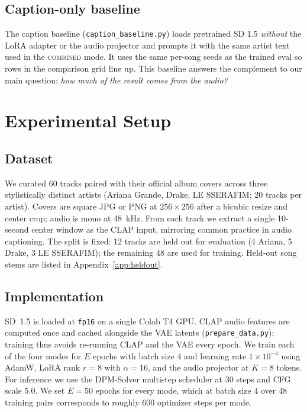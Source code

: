 \documentclass{article}
\begin{document}
\subsection{Caption-only baseline}
The caption baseline (\texttt{caption\_baseline.py}) loads pretrained SD
1.5 \emph{without} the LoRA adapter or the audio projector and prompts it
with the same artist text used in the \textsc{combined} mode. It uses the
same per-song seeds as the trained eval so rows in the comparison grid line
up. This baseline answers the complement to our main question: \emph{how
much of the result comes from the audio?}

\section{Experimental Setup}
\label{sec:setup}

\subsection{Dataset}
We curated 60 tracks paired with their official album covers across three
stylistically distinct artists (Ariana Grande, Drake, LE SSERAFIM; 20 tracks
per artist). Covers are square JPG or PNG at $256\times256$ after a
bicubic resize and center crop; audio is mono at 48~kHz. From each track we
extract a single 10-second center window as the CLAP input, mirroring
common practice in audio captioning. The split is fixed: 12 tracks are held
out for evaluation (4 Ariana, 5 Drake, 3 LE SSERAFIM); the remaining 48
are used for training. Held-out song stems are listed in
Appendix~\ref{app:heldout}.

\subsection{Implementation}
SD~1.5 is loaded at \texttt{fp16} on a single Colab T4 GPU. CLAP audio
features are computed once and cached alongside the VAE latents
(\texttt{prepare\_data.py}); training thus avoids re-running CLAP and the
VAE every epoch. We train each of the four modes for $E$ epochs with batch
size $4$ and learning rate $1\!\times\!10^{-4}$ using AdamW, LoRA rank $r=8$
with $\alpha=16$, and the audio projector at $K=8$ tokens. For inference we
use the DPM-Solver multistep scheduler at 30 steps and CFG scale 5.0.
We set $E=50$ epochs for every mode, which at batch size $4$ over $48$
training pairs corresponds to roughly $600$ optimizer steps per mode.
\end{document}
